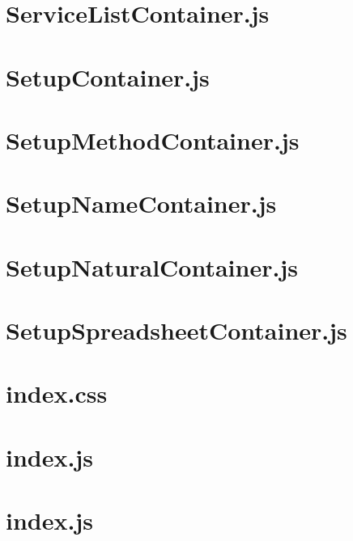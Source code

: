 \documentclass[a4paper,landscape]{report}
\begin{document}
\newpage
\section{ServiceListContainer.js}


\newpage
\section{SetupContainer.js}


\newpage
\section{SetupMethodContainer.js}


\newpage
\section{SetupNameContainer.js}


\newpage
\section{SetupNaturalContainer.js}


\newpage
\section{SetupSpreadsheetContainer.js}


\newpage
\section{index.css}


\newpage
\section{index.js}


\newpage
\section{index.js}

\end{document}
